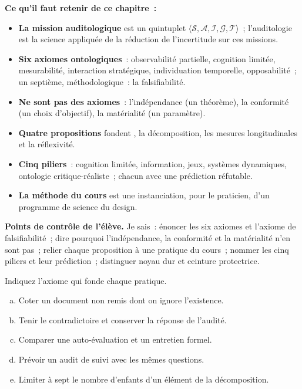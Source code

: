 \begin{boxresume}
\textbf{Ce qu'il faut retenir de ce chapitre~:}
\begin{itemize}
    \item \textbf{La mission auditologique} est un quintuplet
          $\langle \mathcal{S}, \mathcal{A}, \mathcal{I}, \mathcal{G},
          \mathcal{T} \rangle$~; l'auditologie est la science appliquée de
          la réduction de l'incertitude sur ces missions.
    \item \textbf{Six axiomes ontologiques}~: observabilité partielle,
          cognition limitée, mesurabilité, interaction stratégique,
          individuation temporelle, opposabilité~; un septième,
          méthodologique~: la falsifiabilité.
    \item \textbf{Ne sont pas des axiomes}~: l'indépendance (un théorème),
          la conformité (un choix d'objectif), la matérialité (un
          paramètre).
    \item \textbf{Quatre propositions} fondent \NEK{}, la décomposition, les
          mesures longitudinales et la réflexivité.
    \item \textbf{Cinq piliers}~: cognition limitée, information, jeux,
          systèmes dynamiques, ontologie critique-réaliste~; chacun avec une
          prédiction réfutable.
    \item \textbf{La méthode du cours} est une instanciation, pour le
          praticien, d'un programme de science du design.
\end{itemize}
\end{boxresume}

\begin{boxinfo}
\textbf{Points de contrôle de l'élève.} Je sais~: énoncer les six axiomes
et l'axiome de falsifiabilité~; dire pourquoi l'indépendance, la
conformité et la matérialité n'en sont pas~; relier chaque proposition à
une pratique du cours~; nommer les cinq piliers et leur prédiction~;
distinguer noyau dur et ceinture protectrice.
\end{boxinfo}

\bigskip

\begin{boxexo}[title={\ding{45}\quad Exercice~30.1. De la pratique à l'axiome \niveaubase}]
Indiquez l'axiome qui fonde chaque pratique.
\begin{enumerate}[(a)]
    \item Coter \NEK{} un document non remis dont on ignore l'existence.
    \item Tenir le contradictoire et conserver la réponse de l'audité.
    \item Comparer une auto-évaluation et un entretien formel.
    \item Prévoir un audit de suivi avec les mêmes questions.
    \item Limiter à sept le nombre d'enfants d'un élément de la
          décomposition.
\end{enumerate}
\end{boxexo}

